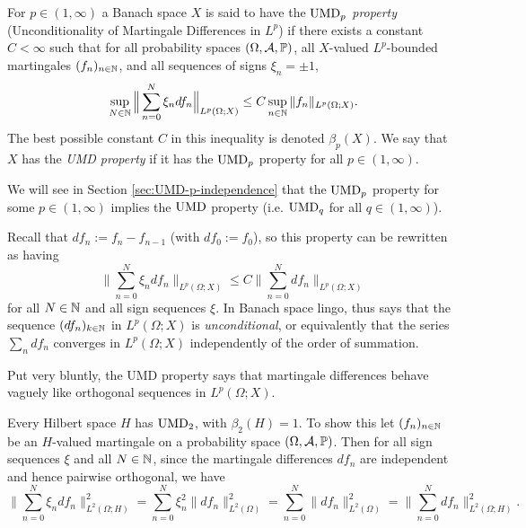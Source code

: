 \begin{defn}
  For $p \in (1,\infty)$ a Banach space $X$ is said to have the \emph{$\mathrm{UMD}_{p}$ property} (Unconditionality of Martingale Differences in $L^p$) if there exists a constant $C < \infty$ such that for all probability spaces $(\Omega,\mathcal{A},\mathbb{P})$, all $X$-valued $L^p$-bounded martingales $(f_n)_{n \in \mathbb{N}}$, and all sequences of signs $\xi_n = \pm 1$,
  \begin{equation*}
    \sup_{N \in \mathbb{N}} \Big\| \sum_{n=0}^{N} \xi_{n} df_{n} \Big\|_{L^p(\Omega;X)} \leq C \sup_{n \in \mathbb{N}} \|f_n\|_{L^p(\Omega;X)}.
  \end{equation*}
  The best possible constant $C$ in this inequality is denoted $\beta_{p}(X)$.
  We say that $X$ has the \emph{UMD property} if it has the $\mathrm{UMD}_{p}$ property for all $p \in (1,\infty)$.
\end{defn}

\begin{rmk}
  We will see in Section \ref{sec:UMD-p-independence} that the $\mathrm{UMD}_{p}$ property for some $p \in (1,\infty)$ implies the $\mathrm{UMD}$ property (i.e. $\mathrm{UMD}_{q}$ for all $q \in (1,\infty)$).
\end{rmk}

Recall that $df_{n} := f_n - f_{n-1}$ (with $df_0 := f_0$), so this property can be rewritten as having
\begin{equation*}
  \Big\| \sum_{n=0}^{N} \xi_{n} df_{n} \Big\|_{L^p(\Omega;X)} \leq C \Big\| \sum_{n=0}^{N} df_{n}\Big\|_{L^p(\Omega;X)}
\end{equation*}
for all $N \in \mathbb{N}$ and all sign sequences $\xi$.
In Banach space lingo, thus says that the sequence $(df_n)_{k \in \mathbb{N}}$ in $L^p(\Omega;X)$ is \emph{unconditional}, or equivalently that the series $\sum_{n} df_n$ converges in $L^p(\Omega;X)$ independently of the order of summation.

Put very bluntly, the UMD property says that martingale differences behave vaguely like orthogonal sequences in $L^p(\Omega;X)$.

\begin{example}
  Every Hilbert space $H$ has $\mathrm{UMD}_{2}$, with $\beta_{2}(H) = 1$.
  To show this let $(f_n)_{n \in \mathbb{N}}$ be an $H$-valued martingale on a probability space $(\Omega,\mathcal{A},\mathbb{P})$.
  Then for all sign sequences $\xi$ and all $N \in \mathbb{N}$, since the martingale differences $df_{n}$ are independent and hence pairwise orthogonal, we have
  \begin{equation*}
      \Big\| \sum_{n=0}^N \xi_{n} df_{n} \Big\|_{L^2(\Omega;H)}^{2}
      = \sum_{n = 0}^{N} \xi_{n}^{2} \|df_{n}\|_{L^2(\Omega)}^{2}
      = \sum_{n = 0}^{N} \|df_{n}\|_{L^2(\Omega)}^{2}
      = \Big\| \sum_{n=0}^N df_{n} \Big\|_{L^2(\Omega;H)}^{2}.
  \end{equation*}
\end{example}

